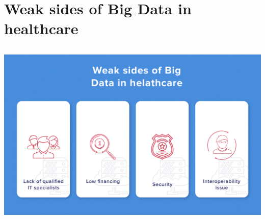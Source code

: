 \documentclass[10pt,a4paper,twoside]{article}
\begin{document}
\section*{Weak sides of Big Data in healthcare} 

\begin{center}
    \includegraphics[width=14cm, height=9cm]{weak-sides} \\[\baselineskip]
\end{center}
\end{document}
